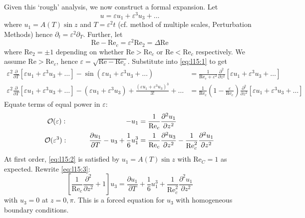 \documentclass{jknotes}
\newcommand{\ReN}{\text{Re}}
\newcommand{\veps}{\varepsilon}
\begin{document}
Given this `rough' analysis, we now construct a formal expansion. Let
\begin{equation}
	u = \veps u_1 + \veps^3 u_3 + \dots
\end{equation}
where $u_1 = A(T) \sin z$ and $T = \veps^2 t$ (cf. method of multiple scales,
Perturbation Methods) hence $\partial_t = \veps^2 \partial_T$. Further, let
\begin{equation}
	\ReN - \ReN_c = \veps^2 \ReN_2 = \Delta \ReN
\end{equation}
where $\ReN_2 = \pm 1$ depending on whether $\ReN > \ReN_c$ or $\ReN <
\ReN_c$ respectively. We assume $\ReN > \ReN_c$, hence $\veps = \sqrt{\ReN -
\ReN_c}$. Substitute into \eqref{eq:l15:1} to get
\begin{align}
	\veps^2 \frac{\partial}{\partial T}\left[ \veps u_1 + \veps^3 u_3 +
	\dots\right] - \sin(\veps u_1 + \veps^3 u_3 + \dots) &= \frac{1}{\ReN_c +
	\veps^2} \frac{\partial^2}{\partial z^2}\left[\veps u_1 + \veps^3 u_3 +
	\dots \right] \\
	\veps^2 \frac{\partial}{\partial T}\left[ \veps u_1 + \veps^3 u_3 + \dots
	\right] - (\veps u_1 + \veps^3 u_3) + \frac{(\veps u_1 + \veps^3
	u_3)^3}{3!} + \dots &= \frac{1}{\ReN_c}\left(1-\frac{\veps}{\ReN_c}\right)
	\frac{\partial^2}{\partial z^2}\left[ \veps u_1 + \veps^3 u_3 + \dots
	\right]
\end{align}
Equate terms of equal power in $\veps$:
\begin{align}
	\mathcal{O}(\veps): \hspace{8.35em}-u_1 &=\frac{1}{\ReN_c}\frac{\partial^2
	u_1}{\partial z^2}\label{eq:l15:2} \\
	\mathcal{O}(\veps^3): \hspace{3em}\frac{\partial u_1}{\partial T} - u_3 +
	\frac{1}{6}u_1^3 &= \frac{1}{\ReN_c}\frac{\partial^2 u_3}{\partial z^2} -
	\frac{1}{\ReN_c^2}\frac{\partial^2 u_1}{\partial z^2}\label{eq:l15:3}
\end{align}
At first order, \eqref{eq:l15:2} is satisfied by $u_1 = A(T)\sin z$ with
$\ReN_C = 1$ as expected. Rewrite \eqref{eq:l15:3}:
\begin{equation}
	\left[\frac{1}{\ReN_c} \frac{\partial^2}{\partial z^2} + 1 \right] u_3 =
	\frac{\partial u_1}{\partial T} + \frac{1}{6}u_1^3 + \frac{1}{\ReN^2_c}
	\frac{\partial^2 u_1}{\partial z^2} \label{eq:l15:4}
\end{equation}
with $u_3 = 0$ at $z=0,\pi$. This is a forced equation for $u_3$ with
homogeneous boundary conditions.
\end{document}
